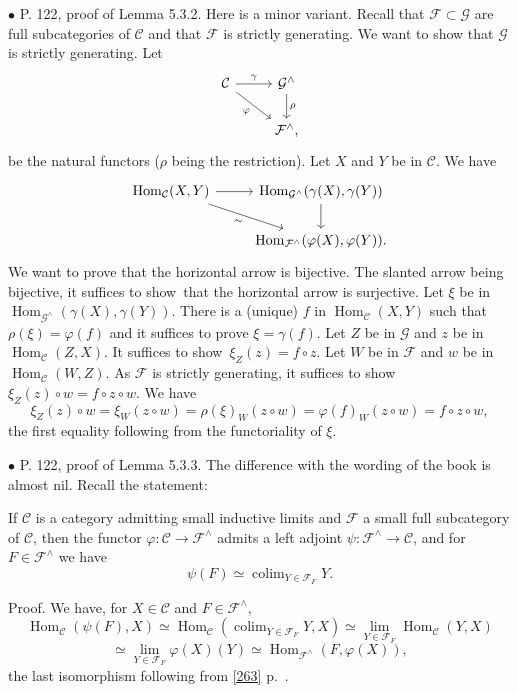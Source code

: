 \documentclass[12pt]{article}
\theoremstyle{remark}%
\newcommand{\bu}{\bullet}
\newcommand{\n}{\noindent}
\newcommand{\C}{\mathcal C}
\newcommand{\F}{\mathcal F}
\newcommand{\G}{\mathcal G}
\newcommand{\p}{\varphi}
\newcommand{\sts}{t suffices to show}
\DeclareMathOperator*{\co}{colim}
\DeclareMathOperator{\h}{Hom}
\begin{document}
\n$\bu$ P. 122, proof of Lemma 5.3.2. Here is a minor variant. Recall that $\F\subset\G$ are full subcategories of $\C$ and that $\F$ is strictly generating. We want to show that $\G$ is strictly generating. Let 
$$
\begin{tikzcd}
\C\ar{r}{\gamma}\ar{dr}[swap]{\p}&\G^\wedge\ar{d}{\rho}\\
&\F^\wedge,
\end{tikzcd}
$$ 
be the natural functors ($\rho$ being the restriction). Let $X$ and $Y$ be in $\C$. We have 
$$
\begin{tikzcd}
\h_\C(X,Y)\ar{r}\ar{dr}[swap]{\sim}&\h_{\G^\wedge}(\gamma(X),\gamma(Y))\ar{d}\\
&\h_{\F^\wedge}(\p(X),\p(Y)). 
\end{tikzcd}
$$ 
We want to prove that the horizontal arrow is bijective. The slanted arrow being bijective, i\sts\ that the horizontal arrow is surjective. Let $\xi$ be in $\h_{\G^\wedge}(\gamma(X),\gamma(Y))$. There is a (unique) $f$ in $\h_\C(X,Y)$ such that $\rho(\xi)=\p(f)$ and it suffices to prove $\xi=\gamma(f)$. Let $Z$ be in $\G$ and $z$ be in $\h_\C(Z,X)$. I\sts\ $\xi_Z(z)=f\circ z$. Let $W$ be in $\F$ and $w$ be in $\h_\C(W,Z)$. As $\F$ is strictly generating, i\sts\ $\xi_Z(z)\circ w=f\circ z\circ w$. We have 
$$
\xi_Z(z)\circ w=\xi_W(z\circ w)=\rho(\xi)_W(z\circ w)=\p(f)_W(z\circ w)
=f\circ z\circ w, 
$$ 
the first equality following from the functoriality of $\xi$. 


\n$\bu$ P. 122, proof of Lemma 5.3.3. The difference with the wording of the book is almost nil. Recall the statement: 

If $\C$ is a category admitting small inductive limits and $\F$ a small full subcategory of $\C$, then the functor $\p:\C\to\F^\wedge$ admits a left adjoint $\psi:\F^\wedge\to\C$, and for $F\in\F^\wedge$ we have 
$$
\psi(F)\simeq\co_{Y\in\F_F}Y. 
$$

Proof. We have, for $X\in\C$ and $F\in\F^\wedge$, 
$$
\h_\C(\psi(F),X)\simeq\h_\C\left(\co_{Y\in\F_F}Y,X\right)\simeq\lim_{Y\in\F_F}\h_\C(Y,X)
$$ 
$$
\simeq\lim_{Y\in\F_F}\p(X)(Y)\simeq\h_{\F^\wedge}(F,\p(X)),
$$ 
the last isomorphism following from \eqref{263} p.~\pageref{263}. 

\end{document}

